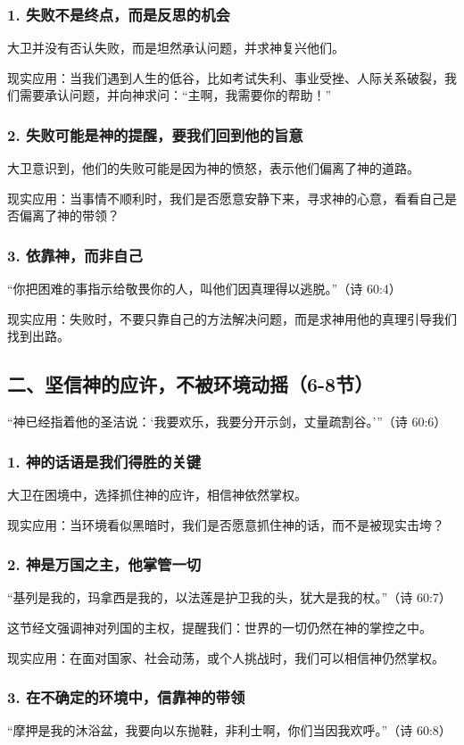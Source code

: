 \documentclass[a4paper, 12pt]{article}
\begin{document}
\subsubsection*{1. 失败不是终点，而是反思的机会}
\hspace{0.6cm}大卫并没有否认失败，而是坦然承认问题，并求神复兴他们。

现实应用：当我们遇到人生的低谷，比如考试失利、事业受挫、人际关系破裂，我们需要承认问题，并向神求问：“主啊，我需要你的帮助！”
\subsubsection*{2. 失败可能是神的提醒，要我们回到他的旨意}
\hspace{0.6cm}大卫意识到，他们的失败可能是因为神的愤怒，表示他们偏离了神的道路。

现实应用：当事情不顺利时，我们是否愿意安静下来，寻求神的心意，看看自己是否偏离了神的带领？
\subsubsection*{3. 依靠神，而非自己}
“你把困难的事指示给敬畏你的人，叫他们因真理得以逃脱。”（诗 60:4）

现实应用：失败时，不要只靠自己的方法解决问题，而是求神用他的真理引导我们找到出路。
\subsection*{二、坚信神的应许，不被环境动摇（6-8节）}
“神已经指着他的圣洁说：‘我要欢乐，我要分开示剑，丈量疏割谷。’”（诗 60:6）

\subsubsection*{1. 神的话语是我们得胜的关键}
\hspace{0.6cm}大卫在困境中，选择抓住神的应许，相信神依然掌权。

现实应用：当环境看似黑暗时，我们是否愿意抓住神的话，而不是被现实击垮？
\subsubsection*{2. 神是万国之主，他掌管一切}
“基列是我的，玛拿西是我的，以法莲是护卫我的头，犹大是我的杖。”（诗 60:7）

这节经文强调神对列国的主权，提醒我们：世界的一切仍然在神的掌控之中。

现实应用：在面对国家、社会动荡，或个人挑战时，我们可以相信神仍然掌权。
\subsubsection*{3. 在不确定的环境中，信靠神的带领}
“摩押是我的沐浴盆，我要向以东抛鞋，非利士啊，你们当因我欢呼。”（诗 60:8）
\end{document}
